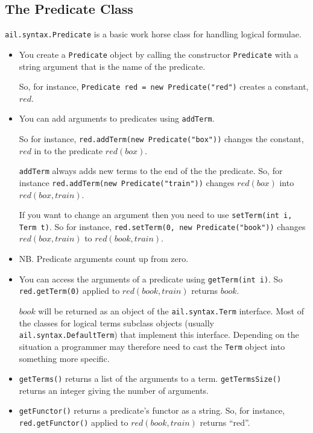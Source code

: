 \documentclass[a4]{article}
\begin{document}
\subsection{The Predicate Class}
\texttt{ail.syntax.Predicate} is a basic work horse class for handling logical formulae.

\begin{itemize}
\item You create a \texttt{Predicate} object by calling the constructor \texttt{Predicate} with a string argument that is the name of the predicate.

So, for instance, \texttt{Predicate red = new Predicate("red")} creates a constant, $red$.  
\item You can add arguments to predicates using \texttt{addTerm}.

So for instance, \texttt{red.addTerm(new Predicate("box"))} changes the constant, $red$ in to the predicate $red(box)$.  

\texttt{addTerm} always adds new terms to the end of the the predicate.  So, for instance \texttt{red.addTerm(new Predicate("train"))} changes $red(box)$ into $red(box, train)$.  

If you want to change an argument then you need to use \texttt{setTerm(int i, Term t)}.  So for instance, \texttt{red.setTerm(0, new Predicate("book"))} changes $red(box, train)$ to $red(book, train)$.
\item NB.  Predicate arguments count up from zero.
\item You can access the arguments of a predicate using \texttt{getTerm(int i)}.  So \texttt{red.getTerm(0)} applied to $red(book, train)$ returns $book$.

\begin{sloppypar}
$book$ will be returned as an object of the \texttt{ail.syntax.Term} interface.  Most of the classes for logical terms subclass objects (usually \texttt{ail.syntax.DefaultTerm}) that implement this interface.  Depending on the situation a programmer may therefore need to cast the \texttt{Term} object into something more specific.
\end{sloppypar}
\item \texttt{getTerms()} returns a list of the arguments to a term.  \texttt{getTermsSize()} returns an integer giving the number of arguments.
\item \texttt{getFunctor()} returns a predicate's functor as a string.  So, for instance, \texttt{red.getFunctor()} applied to $red(book, train)$ returns ``red''.
\end{itemize}
\end{document}
